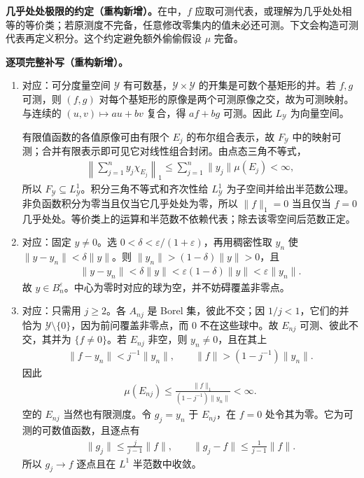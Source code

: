 \documentclass[../../main.tex]{subfiles}
\begin{document}
\begin{remark}
\textbf{几乎处处极限的约定（重构新增）。}在中，$f$ 应取可测代表，或理解为几乎处处相等的等价类；若原测度不完备，任意修改零集内的值未必还可测。下文会构造可测代表再定义积分。这个约定避免额外偷偷假设 $\mu$ 完备。
\end{remark}
\begin{solution}
\textbf{逐项完整补写（重构新增）。}
\begin{enumerate}
\item 对应：可分度量空间 $\mathcal Y$ 有可数基，$\mathcal Y\times\mathcal Y$ 的开集是可数个基矩形的并。若 $f,g$ 可测，则 $(f,g)$ 对每个基矩形的原像是两个可测原像之交，故为可测映射。与连续的 $(u,v)\mapsto au+bv$ 复合，得 $af+bg$ 可测。因此 $L_{\mathcal Y}$ 为向量空间。

有限值函数的各值原像可由有限个 $E_j$ 的布尔组合表示，故 $F_{\mathcal Y}$ 中的映射可测；合并有限表示即可见它对线性组合封闭。由点态三角不等式，
\begin{align*}
\left\|\sum_{j=1}^ny_j\chi_{E_j}\right\|_1
\le\sum_{j=1}^n\|y_j\|\mu(E_j)<\infty,
\end{align*}
所以 $F_{\mathcal Y}\subseteq L_{\mathcal Y}^1$。积分三角不等式和齐次性给 $L_{\mathcal Y}^1$ 为子空间并给出半范数公理。非负函数积分为零当且仅当它几乎处处为零，所以 $\|f\|_1=0$ 当且仅当 $f=0$ 几乎处处。等价类上的运算和半范数不依赖代表；除去该零空间后范数正定。
\item 对应：固定 $y\ne0$。选 $0<\delta<\varepsilon/(1+\varepsilon)$，再用稠密性取 $y_n$ 使 $\|y-y_n\|<\delta\|y\|$。则 $\|y_n\|>(1-\delta)\|y\|>0$，且
\begin{align*}
\|y-y_n\|<\delta\|y\|<\varepsilon(1-\delta)\|y\|<\varepsilon\|y_n\|.
\end{align*}
故 $y\in B_n^\varepsilon$。中心为零时对应的球为空，并不妨碍覆盖非零点。
\item 对应：只需用 $j\ge2$。各 $A_{nj}$ 是 Borel 集，彼此不交；因 $1/j<1$，它们的并恰为 $\mathcal Y\setminus\{0\}$，因为前问覆盖非零点，而 $0$ 不在这些球中。故 $E_{nj}$ 可测、彼此不交，其并为 $\{f\ne0\}$。若 $E_{nj}$ 非空，则 $y_n\ne0$，且在其上
\begin{align*}
\|f-y_n\|<j^{-1}\|y_n\|,\qquad
\|f\|>(1-j^{-1})\|y_n\|.
\end{align*}
因此
\begin{align*}
\mu(E_{nj})\le\frac{\|f\|_1}{(1-j^{-1})\|y_n\|}<\infty.
\end{align*}
空的 $E_{nj}$ 当然也有限测度。令 $g_j=y_n$ 于 $E_{nj}$，在 $f=0$ 处令其为零。它为可测的可数值函数，且逐点有
\begin{align*}
\|g_j\|\le\frac j{j-1}\|f\|,\qquad
\|g_j-f\|\le\frac1{j-1}\|f\|.
\end{align*}
所以 $g_j\to f$ 逐点且在 $L^1$ 半范数中收敛。


\end{enumerate}
\end{solution}
\end{document}
